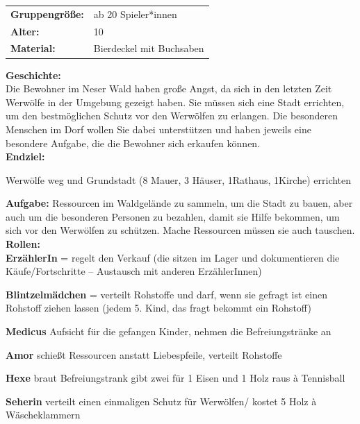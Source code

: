 \begin{table}[H]
\begin{tabular}{>{\bfseries}lp{8cm}}
   Gruppengröße:   & ab 20 Spieler*innen\\
    Alter: & 10 \\
    Material: & Bierdeckel mit Buchsaben \\ 
\end{tabular}
\end{table} 


\textbf{Geschichte:}\\
Die Bewohner im Neser Wald haben große Angst, da sich in den letzten Zeit Werwölfe in der Umgebung gezeigt haben. Sie müssen sich eine Stadt errichten, um den bestmöglichen Schutz vor den Werwölfen zu erlangen. Die besonderen Menschen im Dorf wollen Sie dabei unterstützen und haben jeweils eine besondere Aufgabe, die die Bewohner sich erkaufen können.  \\

\textbf{Endziel:}  

Werwölfe weg und Grundstadt (8 Mauer, 3 Häuser, 1Rathaus, 1Kirche) errichten 

\textbf{Aufgabe:}
Ressourcen im Waldgelände zu sammeln, um die Stadt zu bauen, aber auch um die besonderen Personen zu bezahlen, damit sie Hilfe bekommen, um sich vor den Werwölfen zu schützen. Mache Ressourcen müssen sie auch tauschen. \\
\textbf{Rollen:}\\
\textbf{ErzählerIn} = regelt den Verkauf (die sitzen im Lager und dokumentieren die Käufe/Fortschritte – Austausch mit anderen ErzählerInnen) 

\textbf{Blintzelmädchen} = verteilt Rohstoffe und darf, wenn sie gefragt ist einen Rohstoff ziehen lassen (jedem 5. Kind, das fragt bekommt ein Rohstoff) 

\textbf{Medicus} Aufsicht für die gefangen Kinder, nehmen die Befreiungstränke an

\textbf{Amor}  schießt Ressourcen anstatt Liebespfeile, verteilt Rohstoffe

\textbf{Hexe} braut Befreiungstrank gibt zwei für 1 Eisen und 1 Holz raus à Tennisball 

\textbf{Seherin} verteilt einen einmaligen Schutz für Werwölfen/ kostet 5 Holz à Wäscheklammern  

